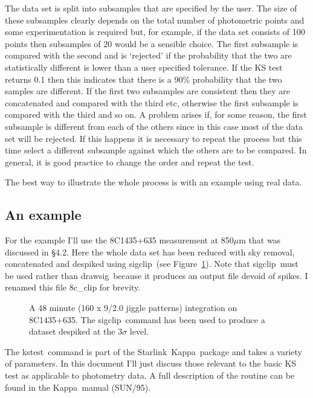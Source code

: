 \documentclass[twoside,11pt,fleqn]{article}
\newcommand{\starlink}{\htmladdnormallink{Starlink}{http://star-www.rl.ac.uk/}}
\newcommand{\Kappa}{\xref{{\sc Kappa}}{sun95}{}}
\newcommand{\task}[1]{{\sf #1}}
\newcommand{\sigclip}{\xref{\task{sigclip}}{sun216}{SIGCLIP}}
\newcommand{\drawsig}{\xref{\task{drawsig}}{sun95}{DRAWSIG}}
\newcommand{\kstest}{\xref{\task{kstest}}{sun95}{KSTEST}}
\newcommand{\htmladdnormallink}[2]{#1}
\newcommand{\xref}[3]{#1}
\begin{document}
The data set is split into subsamples that are specified by the
user. The size of these subsamples clearly depends on the total number
of photometric points and some experimentation is required but, for
example, if the data set consists of 100 points then subsamples of 20
would be a sensible choice. The first subsample is compared with the
second and is `rejected' if the probability that the two are
statistically different is lower than a user specified tolerance. If
the KS test returns 0.1 then this indicates that there is a 90\%
probability that the two samples are different. If the first two
subsamples are consistent then they are concatenated and compared with
the third etc, otherwise the first subsample is compared with the
third and so on. A problem arises if, for some reason, the first
subsample is different from each of the others since in this case most
of the data set will be rejected. If this happens it is necessary to
repeat the process but this time select a different subsample against
which the others are to be compared. In general, it is good practice
to change the order and repeat the test.

The best way to illustrate the whole process is with an example using 
real data.
 
\subsection{An example}

For the example I'll use the 8C1435+635 measurement at 850$\mu$m that was
discussed in \S 4.2. Here the whole data set has been reduced with sky
removal, concatenated and despiked using \sigclip\ (see Figure~\ref{f4}). Note
that \sigclip\ must be used rather than \drawsig\ because it produces an
output file devoid of spikes. I renamed this file 8c\_clip for brevity.

\begin{figure}
\caption{A 48 minute (160 x 9/2.0 jiggle patterns) integration on
8C1435+635. The \sigclip\ command has been used to produce a
dataset despiked at the 3$\sigma$ level.}
\label{f4}
\end{figure}

The \kstest\ command is part of the \starlink\
\Kappa\ package and
takes a variety of parameters. In this document I'll just discuss those
relevant to the basic KS test as applicable to photometry data. A full
description of the routine can be found in the \Kappa\ manual
(\xref{SUN/95}{sun95}{}).
\end{document}
